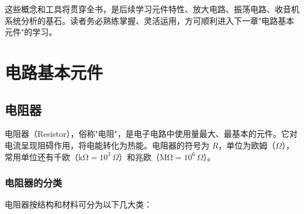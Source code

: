 \documentclass[12pt,UTF8]{ctexbook}
\begin{document}
这些概念和工具将贯穿全书，是后续学习元件特性、放大电路、振荡电路、收音机系统分析的基石。读者务必熟练掌握、灵活运用，方可顺利进入下一章"电路基本元件"的学习。


\chapter{电路基本元件}
\label{chap:basic_components}

\section{电阻器}
\label{sec:resistor}

电阻器（Resistor），俗称"电阻"，是电子电路中使用量最大、最基本的元件。它对电流呈现阻碍作用，将电能转化为热能。电阻器的符号为 $R$，单位为欧姆（$\Omega$），常用单位还有千欧（$\mathrm{k\Omega}=10^3\,\Omega$）和兆欧（$\mathrm{M\Omega}=10^6\,\Omega$）。

\subsection{电阻器的分类}

电阻器按结构和材料可分为以下几大类：
\end{document}
